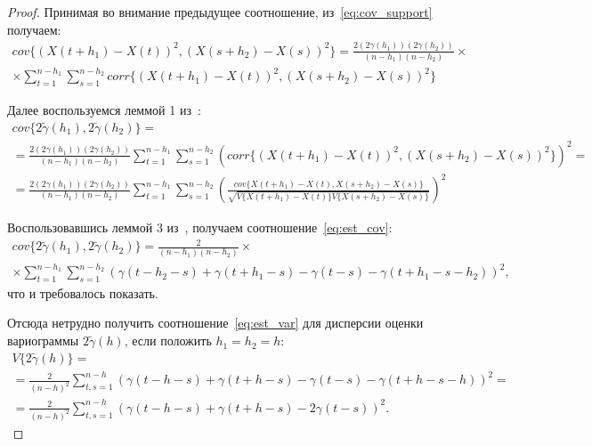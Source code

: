 \begin{proof}
Принимая во внимание предыдущее соотношение, из~\eqref{eq:cov_support} получаем:
\begin{equation*}\begin{gathered}
	cov\{ (X(t + h_1) - X(t))^2, (X(s + h_2) - X(s))^2 \} = \frac{2 (2\gamma(h_1))(2\gamma(h_2))}{(n - h_1)(n - h_2)} \times \\
	\times \sum_{t = 1}^{n - h_1}\sum_{s = 1}^{n - h_2} corr\{(X(t + h_1) - X(t))^2, (X(s + h_2) - X(s))^2 \}
\end{gathered}\end{equation*}

Далее воспользуемся леммой 1 из~\cite{tsekhavaya-brest}:
\begin{equation*}\begin{gathered}
	cov\{ 2 \tilde{\gamma}(h_1), 2 \tilde{\gamma}(h_2) \} = \\
	= \frac{2 (2\gamma(h_1))(2\gamma(h_2))}{(n - h_1)(n - h_2)} \sum_{t = 1}^{n - h_1}\sum_{s = 1}^{n - h_2} (corr\{(X(t + h_1) - X(t))^2, (X(s + h_2) - X(s))^2 \})^2 = \\
	= \frac{2 (2\gamma(h_1))(2\gamma(h_2))}{(n - h_1)(n - h_2)}\sum_{t = 1}^{n - h_1}\sum_{s = 1}^{n - h_2} ( \frac{cov\{ X(t + h_1) - X(t), X(s + h_2) - X(s) \}}{\sqrt{V\{ X( t + h_1) - X(t) \} V\{ X(s + h_2) - X(s) \}}} )^2
\end{gathered}\end{equation*}

Воспользовавшись леммой 3 из~\cite{tsekhavaya-brest}, получаем соотношение~\eqref{eq:est_cov}:
\begin{gather*}
	cov\{ 2 \tilde{\gamma}(h_1), 2 \tilde{\gamma}(h_2) \} = \frac{2}{(n - h_1)(n - h_2)} \times \\
	\times \sum_{t = 1}^{n - h_1}\sum_{s = 1}^{n - h_2} (\gamma(t - h_2 - s) + \gamma(t + h_1 - s) - \gamma(t - s) - \gamma(t + h_1 - s - h_2))^2,
\end{gather*}
что и требовалось показать.

Отсюда нетрудно получить соотношение~\eqref{eq:est_var} для дисперсии оценки вариограммы $ 2 \tilde{\gamma}(h) $, если положить $ h_1 = h_2 = h $:
\begin{equation*}\begin{gathered}
	V \{ 2 \tilde{\gamma}(h) \} = \\
	= \frac{2}{(n - h)^2}\sum_{t,s = 1}^{n - h} ( \gamma(t - h - s) + \gamma(t + h - s) - \gamma(t - s) - \gamma(t + h - s - h) )^2 = \\
	= \frac{2}{(n-h)^2}\sum_{t,s = 1}^{n - h} ( \gamma(t - h - s) + \gamma(t + h - s) - 2\gamma(t - s) )^2.
\end{gathered}\end{equation*}

\end{proof}

